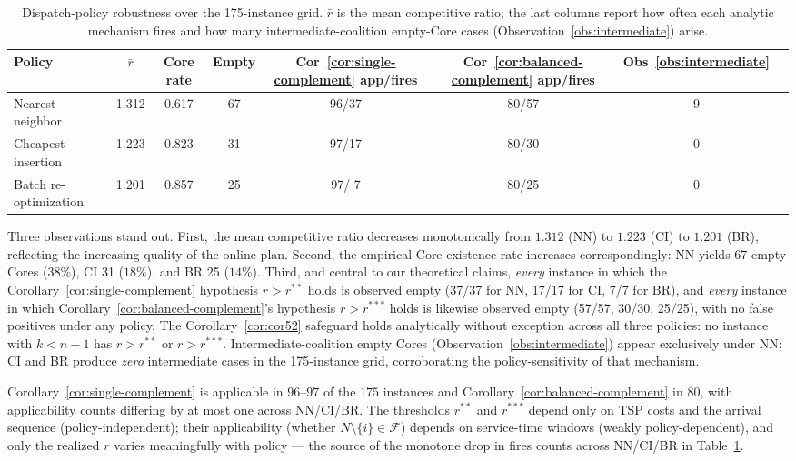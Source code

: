 \documentclass[11pt]{article}
\newcommand{\F}{\mathcal{F}}
\theoremstyle{plain}
\theoremstyle{definition}
\theoremstyle{remark}
\begin{document}
\begin{table}[t]
\centering
\caption{Dispatch-policy robustness over the 175-instance grid. $\bar r$ is the mean competitive ratio; the last columns report how often each analytic mechanism fires and how many intermediate-coalition empty-Core cases (Observation~\ref{obs:intermediate}) arise.}
\label{tab:policy}
\small
\begin{tabular}{@{}lccccccc@{}}
\toprule
Policy & $\bar r$ & Core rate & Empty & Cor~\ref{cor:single-complement} app/fires & Cor~\ref{cor:balanced-complement} app/fires & Obs~\ref{obs:intermediate} \\
\midrule
Nearest-neighbor      & 1.312 & 0.617 & 67 & 96/37 & 80/57 & 9 \\
Cheapest-insertion    & 1.223 & 0.823 & 31 & 97/17 & 80/30 & 0 \\
Batch re-optimization & 1.201 & 0.857 & 25 & 97/ 7 & 80/25 & 0 \\
\bottomrule
\end{tabular}
\end{table}

Three observations stand out. First, the mean competitive ratio decreases monotonically from $1.312$ (NN) to $1.223$ (CI) to $1.201$ (BR), reflecting the increasing quality of the online plan. Second, the empirical Core-existence rate increases correspondingly: NN yields 67 empty Cores ($38\%$), CI 31 ($18\%$), and BR 25 ($14\%$). Third, and central to our theoretical claims, \emph{every} instance in which the Corollary~\ref{cor:single-complement} hypothesis $r>r^{\ast\ast}$ holds is observed empty (37/37 for NN, 17/17 for CI, 7/7 for BR), and \emph{every} instance in which Corollary~\ref{cor:balanced-complement}'s hypothesis $r>r^{\ast\ast\ast}$ holds is likewise observed empty (57/57, 30/30, 25/25), with no false positives under any policy. The Corollary~\ref{cor:cor52} safeguard holds analytically without exception across all three policies: no instance with $k<n-1$ has $r>r^{\ast\ast}$ or $r>r^{\ast\ast\ast}$. Intermediate-coalition empty Cores (Observation~\ref{obs:intermediate}) appear exclusively under NN; CI and BR produce \emph{zero} intermediate cases in the 175-instance grid, corroborating the policy-sensitivity of that mechanism.

Corollary~\ref{cor:single-complement} is applicable in $96$--$97$ of the $175$ instances and Corollary~\ref{cor:balanced-complement} in $80$, with applicability counts differing by at most one across NN/CI/BR. The thresholds $r^{\ast\ast}$ and $r^{\ast\ast\ast}$ depend only on TSP costs and the arrival sequence (policy-independent); their applicability (whether $N\setminus\{i\}\in\F$) depends on service-time windows (weakly policy-dependent), and only the realized $r$ varies meaningfully with policy --- the source of the monotone drop in fires counts across NN/CI/BR in Table~\ref{tab:policy}.
\end{document}
